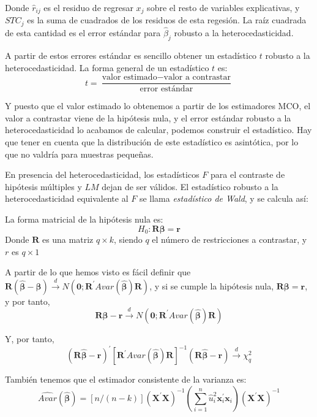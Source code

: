 Donde $\hat{r}_{ij}$ es el residuo de regresar $x_j$ sobre el resto de variables explicativas, y $STC_j$ es la suma de cuadrados de los residuos de esta regesi\'on. La ra\'iz cuadrada de esta cantidad es el error est\'andar para $\hat{\beta}_j$ robusto a la heterocedasticidad.

A partir de estos errores est\'andar es sencillo obtener un estad\'istico $t$ robusto a la heterocedasticidad. La forma general de un estad\'istico $t$ es:
\begin{equation*}
t=\dfrac{\text{valor estimado}-\text{valor a contrastar}}{\text{error est\'andar}}
\end{equation*}

Y puesto que el valor estimado lo obtenemos a partir de los estimadores MCO, el valor a contrastar viene de la hip\'otesis nula, y el error est\'andar robusto a la heterocedasticidad lo acabamos de calcular, podemos construir el estad\'istico. Hay que tener en cuenta que la distribuci\'on de este estad\'istico es asint\'otica, por lo que no valdr\'ia para muestras peque\~nas.

En presencia del heterocedasticidad, los estad\'isticos $F$ para el contraste de hip\'otesis m\'ultiples y $LM$ dejan de ser v\'alidos. El estad\'istico robusto a la heterocedasticidad equivalente al $F$ se llama \textit{estad\'istico de Wald}, y se calcula as\'i:

La forma matricial de la hip\'otesis nula es:
\[ H_0:\boldsymbol{R\beta}=\boldsymbol{r}\]
Donde $\boldsymbol{R}$ es una matriz $q\times k$, siendo $q$ el n\'umero de restricciones a contrastar, y $r$ es $q\times 1$

A partir de lo que hemos visto es f\'acil definir que $\boldsymbol{R}(\hat{\boldsymbol{\beta}}-\boldsymbol{\beta})\overset{d}{\to}N(\boldsymbol{0};\boldsymbol{R}^{\prime}Avar(\hat{\boldsymbol{\beta}})\boldsymbol{R})$, y si se cumple la hip\'otesis nula, $\boldsymbol{R\beta}=\boldsymbol{r}$, y por tanto,
\[\boldsymbol{R}\hat{\boldsymbol{\beta}}-\boldsymbol{r}\overset{d}{\to}N(\boldsymbol{0};\boldsymbol{R}^{\prime}Avar(\hat{\boldsymbol{\beta}})\boldsymbol{R})\]

Y, por tanto,
\[(\boldsymbol{R}\hat{\boldsymbol{\beta}}-\boldsymbol{r})^{\prime}\left[\boldsymbol{R}^{\prime}Avar(\hat{\boldsymbol{\beta}})\boldsymbol{R}\right]^{-1} (\boldsymbol{R}\hat{\boldsymbol{\beta}}-\boldsymbol{r})\overset{d}{\to}\chi^2_q \]


Tambi\'en tenemos que el estimador consistente de la varianza es:
\begin{equation*}
\hat{Avar}(\hat{\boldsymbol{\beta}})=[n/(n-k)]\left(\boldsymbol{X}^{\prime}\boldsymbol{X}\right)^{-1}\left(\sum_{i=1}^n\hat{u}_i^2\boldsymbol{x}_i^{\prime}\boldsymbol{x}_i\right)\left(\boldsymbol{X}^{\prime}\boldsymbol{X}\right)^{-1} 
\end{equation*}

